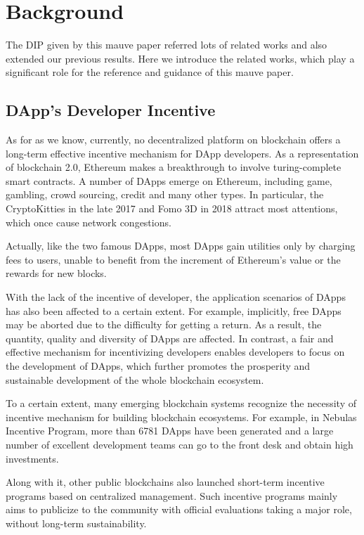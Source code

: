 \section{Background}
\label{sec:background}
The DIP given by this mauve paper referred  lots of related works and also extended our previous results. Here we introduce the related works, which play a significant role for the  reference and guidance of this mauve paper.

\subsection{DApp's Developer Incentive}
As for as we know, currently, no decentralized platform on blockchain offers a long-term effective incentive mechanism for DApp developers. As a representation of blockchain 2.0, Ethereum makes a breakthrough to involve turing-complete smart contracts. A number of DApps emerge on Ethereum, including game, gambling, crowd sourcing, credit and many other types. In particular, the CryptoKitties in the late 2017 and Fomo 3D in 2018 attract most attentions, which once cause network congestions. 

Actually, like the two famous DApps, most DApps gain utilities only by charging fees to users, unable to benefit from the increment of Ethereum's value or the rewards for new blocks. 

With the lack of the incentive of developer, the application scenarios of DApps has also been affected to a certain extent. For example, implicitly, free DApps may be aborted due to the difficulty for getting a return. As a result, the quantity, quality and diversity of DApps are affected. In contrast, a fair and effective mechanism for incentivizing developers enables developers to focus on the development of DApps, which further promotes the prosperity and sustainable development of the whole blockchain ecosystem.

To a certain extent, many emerging blockchain systems recognize the necessity of incentive mechanism for building blockchain ecosystems. For example, in Nebulas Incentive Program, more than 6781 DApps have been generated and a large number of excellent development teams can go to the front desk and obtain high investments. 

Along with it, other public blockchains also launched short-term incentive programs based on centralized management. Such incentive programs mainly aims to publicize to the community with official evaluations taking a major role, without long-term sustainability.


